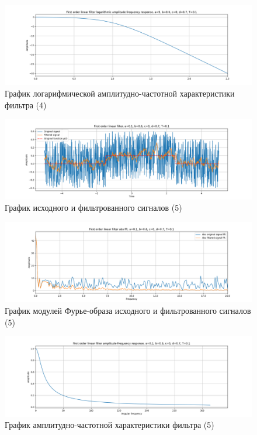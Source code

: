 \documentclass[a4paper, 12pt]{article}
\begin{document}
    \begin{figure}[H]
        \centering
        \includegraphics[scale=0.4]{4_lafr_filtered_linear.png}
        \captionsetup{skip=0pt}
        \caption{График логарифмической амплитудно-частотной характеристики фильтра (4)}
        \label{fig:filinlafr14}
    \end{figure}
    \begin{figure}[H]
        \centering
        \includegraphics[scale=0.4]{5_filtered_linear.png}
        \captionsetup{skip=0pt}
        \caption{График исходного и фильтрованного сигналов (5)}
        \label{fig:filin15}
    \end{figure}
    \begin{figure}[H]
        \centering
        \includegraphics[scale=0.4]{5_abs_filtered_linear.png}
        \captionsetup{skip=0pt}
        \caption{График модулей Фурье-образа исходного и фильтрованного сигналов (5)}
        \label{fig:filinabs15}
    \end{figure}
    \begin{figure}[H]
        \centering
        \includegraphics[scale=0.4]{5_afr_filtered_linear.png}
        \captionsetup{skip=0pt}
        \caption{График амплитудно-частотной характеристики фильтра (5)}
        \label{fig:filinafr15}
    \end{figure}
\end{document}
